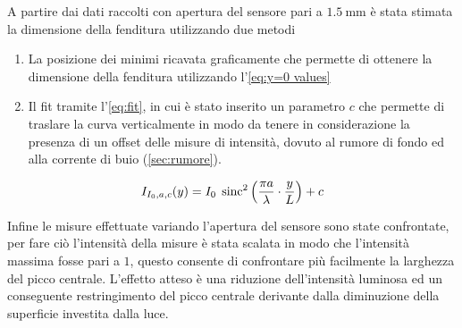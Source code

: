 \documentclass[../main.tex]{subfiles}
\begin{document}
A partire dai dati raccolti con apertura del sensore pari a $\qty{1.5}{\mm}$
è stata stimata la dimensione della fenditura utilizzando due metodi

\begin{enumerate}
    \item La posizione dei minimi ricavata graficamente che permette di ottenere la dimensione della fenditura utilizzando l'\autoref{eq:y=0 values}
    \item Il fit tramite l'\autoref{eq:fit}, in cui è stato inserito un parametro $c$ che permette di traslare la curva verticalmente in modo da tenere in considerazione la presenza di un offset delle misure di intensità, dovuto al rumore di fondo ed alla corrente di buio (\autoref{sec:rumore}).
\end{enumerate}

\begin{equation} \label{eq:fit}
    I_{I_{0}, a, c}(y) = I_{0} \; \operatorname{sinc}^{2} \left( \frac{\pi a}{\lambda} \cdot \frac{y}{L} \right) + c
\end{equation}

Infine le misure effettuate variando l'apertura del sensore sono state confrontate, per fare ciò l'intensità della misure è stata scalata in modo che l'intensità massima fosse pari a $1$, questo consente di confrontare più facilmente la larghezza del picco centrale. L'effetto atteso è una riduzione dell'intensità luminosa ed un conseguente restringimento del picco centrale derivante dalla diminuzione della superficie investita dalla luce.
\end{document}
